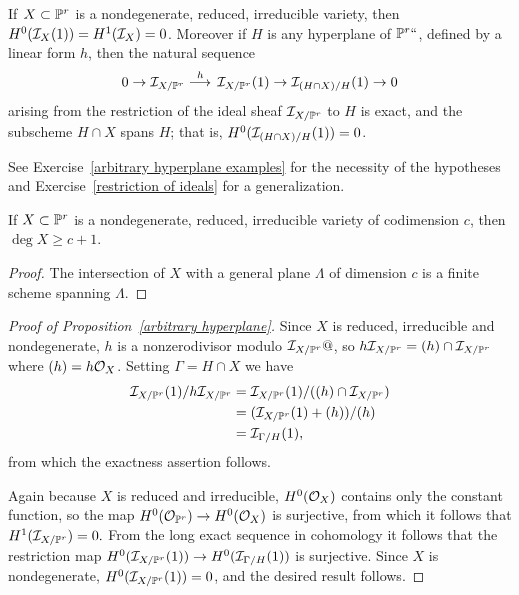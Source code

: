 \begin{proposition}\label{arbitrary hyperplane}
If $\kern1ptX\subset {\mathbb P}^r$ is a nondegenerate, reduced, irreducible variety, 
then $H^0({\mathcal I}_X(1)) = H^1 ({\mathcal I}_X) = 0$. 
Moreover if $H$ is any hyperplane of ${\mathbb P}^r` `$, defined by
a linear form $h$, then the natural
sequence
$$
0\to \sI_{X/\PP^r} \ruto {\ h} \sI_{X/\PP^r}(1)\to \sI_{(H\cap X)/H}(1)\to 0
$$
arising from the restriction of the ideal sheaf ${\mathcal I}_{X/{\mathbb P}^r}$ to $H$ is exact, and the subscheme
$H\cap X$ spans $H$; that is, $H^0({\mathcal I}_{(H\cap X)/H}(1)) = 0$.
\unif
\end{proposition}

See Exercise~\ref{arbitrary hyperplane examples} for the necessity of the hypotheses
and Exercise~\ref{restriction of ideals} for a generalization. 

\begin{corollary}\label{minimal degree bound}
If $X\subset {\mathbb P}^r$ is a nondegenerate, reduced, irreducible variety of codimension $c$, then $\deg X \geq c+1$.
\unif
\end{corollary}

\begin{proof}
 The intersection of $X$ with a general plane $\Lambda$ of dimension $c$ is a finite scheme spanning $\Lambda$.
\unif
\end{proof}

\begin{proof}[Proof of Proposition~\ref{arbitrary hyperplane}]
Since
$X$ is reduced, irreducible and  \null nondegenerate,
$h$ is a nonzerodivisor modulo 
${\mathcal I}_{X/{\mathbb P}^r}@$, so $h{\mathcal I}_{X/{\mathbb P}^r} = (h)\cap {\mathcal I}_{X/{\mathbb P}^r}$ where
$(h) = h{\mathcal O}_{X}$. 
Setting $\Gamma = {H\cap X}$
we have 
$$
\begin{aligned}
{\mathcal I}_{X/{\mathbb P}^r}(1)/h{\mathcal I}_{X/{\mathbb P}^r} &= {\mathcal I}_{X/{\mathbb P}^r}(1)/((h)\cap{\mathcal I}_{X/{\mathbb P}^r})\\
 &=({\mathcal I}_{X/{\mathbb P}^r}(1)+(h))/(h)\\
 &= {\mathcal I}_{\Gamma/H}(1),
\end{aligned}
$$
from which the exactness assertion follows.
 
 Again because $X$ is reduced and irreducible, $H^0({\mathcal O}_X)$ contains only the constant function, so the map $H^0({\mathcal O}_{{\mathbb P}^r}) \to H^0({\mathcal O}_X)$ is surjective, 
from which it follows that $H^1({\mathcal I}_{X/{\mathbb P}^r}) = 0.$ From the long exact sequence in cohomology it follows that
 the restriction map $H^0({\mathcal I}_{X/{\mathbb P}^r}(1))\to H^0({\mathcal I}_{\Gamma/H}(1))$ is surjective. Since
$X$ is nondegenerate, $H^0({\mathcal I}_{X/{\mathbb P}^r}(1)) = 0$, and the desired result follows.
\unif
\end{proof}


